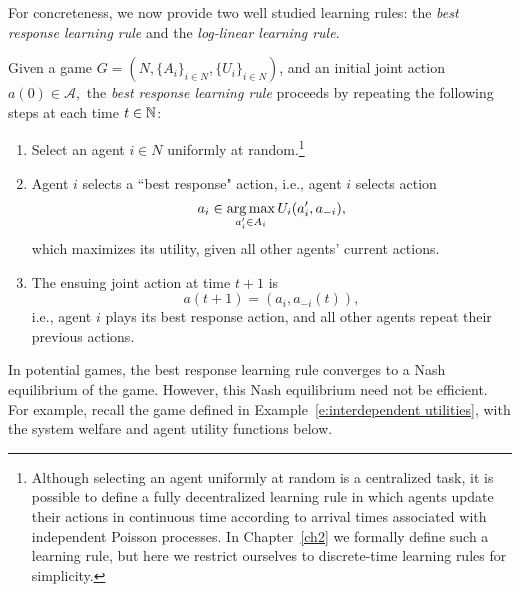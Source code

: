 For concreteness, we now provide two well studied learning rules: the {\it best response learning rule} and the {\it log-linear learning rule}.

\begin{defn}
Given a game $G = \left(N,\{A_i\}_{i\in N},\{U_i\}_{i\in N}\right)$, and an initial joint action $a(0)\in \mathcal{A},$ the {\it best response learning rule} proceeds by repeating the following steps at each time $t\in \mathbb{N}$:
\begin{enumerate}
    \item Select an agent $i\in N$ uniformly at random.\footnote{Although selecting an agent uniformly at random is a centralized task, it is possible to define a fully decentralized learning rule in which agents update their actions in continuous time according to arrival times associated with independent Poisson processes. In Chapter~\ref{ch2} we formally define such a learning rule, but here we restrict ourselves to discrete-time learning rules for simplicity.}
    \item Agent $i$ selects a ``best response" action, i.e., agent $i$ selects action
    $$a_i\in \operatorname*{arg\,max}_{a_i^\prime\in A_i}U_i(a_i^\prime,a_{-i}),$$
    which maximizes its utility, given all other agents' current actions.
    \item The ensuing joint action at time $t+1$ is 
    $$a(t+1) = (a_i,a_{-i}(t)),$$ i.e., agent $i$ plays its best response action, and all other agents repeat their previous actions.
\end{enumerate}
\end{defn}

In potential games, the best response learning rule converges to a Nash equilibrium of the game. However, this Nash equilibrium need not be efficient. For example, recall the game defined in Example~\ref{e:interdependent utilities}, with the system welfare and agent utility functions below.

